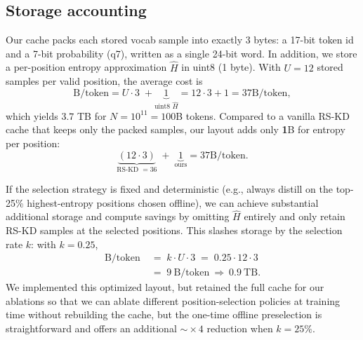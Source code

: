 \documentclass[11pt]{article}
\begin{document}
\subsection{Storage accounting}
Our cache packs each stored vocab sample into exactly 3 bytes: a 17-bit token id and a 7-bit probability (q7), written as a single 24-bit word. In addition, we store a per-position entropy approximation $\hat H$ in uint8 (1 byte). With $U{=}12$ stored samples per valid position, the average cost is
\[
	\text{B/token} = U \cdot 3 \;+ \underbrace{1}_{\text{uint8 }\hat H}
	= 12\cdot 3 + 1 = 37\text{B/token},
\]
which yields $3.7$ TB for $N{=}10^{11}{=}100$B tokens. Compared to a vanilla RS-KD cache that keeps only the packed samples, our layout adds only \textbf{1}B for entropy per position:
\[
	\underbrace{(12 \cdot 3)}_{\text{RS-KD }=36} \;+\; \underbrace{1}_{\text{ours}}
	= 37\text{B/token}.
\]

If the selection strategy is fixed and deterministic (e.g., always distill on the top-25\% highest-entropy positions chosen offline), we can achieve substantial additional storage and compute savings by omitting $\hat H$ entirely and only retain RS-KD samples at the selected positions. This slashes storage by the selection rate $k$: with $k{=}0.25$,
\begin{align*}
	\text{B/token} \;&=\; k \cdot U \cdot 3
	\;=\; 0.25 \cdot 12 \cdot 3 \\
	\;&=\; 9~\text{B/token} \ \Longrightarrow\ 0.9~\text{TB}.
\end{align*}
We implemented this optimized layout, but retained the full cache for our ablations so that we can ablate different position-selection policies at training time without rebuilding the cache, but the one-time offline preselection is straightforward and offers an additional $\sim\!\times4$ reduction when $k{=}25\%$.
\end{document}
